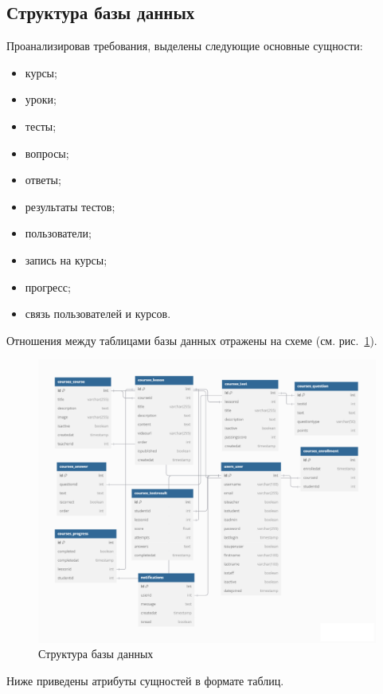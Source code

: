 \subsection{Структура базы данных}

Проанализировав требования, выделены следующие основные сущности:
\begin{itemize}
	\item курсы;
	\item уроки;
	\item тесты;
	\item вопросы;
	\item ответы;
	\item результаты тестов;
	\item пользователи;
	\item запись на курсы;
	\item прогресс;
	\item связь пользователей и курсов.
\end{itemize}

Отношения между таблицами базы данных отражены на схеме (см. рис.~\ref{bd:image}).

\begin{landscape}
	\begin{figure}[ht]
		\centering
		\includegraphics[width=1.2\textwidth]{images/бд} 
		\caption{Структура базы данных}
		\label{bd:image}
	\end{figure}
\end{landscape}

Ниже приведены атрибуты сущностей в формате таблиц.

